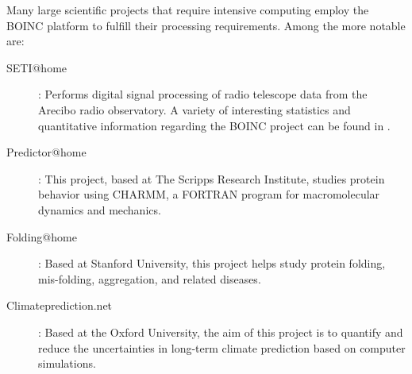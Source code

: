 \documentclass[a4paper,12pt,english]{report}
\begin{document}
Many large scientific projects that require intensive computing employ the BOINC platform to fulfill their processing requirements. Among the more notable are:
\begin{description}
\item [SETI@home]: Performs digital signal processing of radio telescope data from the Arecibo radio observatory. A variety of interesting statistics and quantitative information regarding the BOINC project can be found in \cite{boinc2}.
\item [Predictor@home]: This project, based at The Scripps Research Institute, studies protein behavior using CHARMM, a FORTRAN program for macromolecular dynamics and mechanics.
\item [Folding@home]: Based at Stanford University, this project helps study protein folding, mis-folding, aggregation, and related diseases.
\item [Climateprediction.net]: Based at the Oxford University, the aim of this project is to quantify and reduce the uncertainties in long-term climate prediction based on computer simulations.
\end{description}
\end{document}
